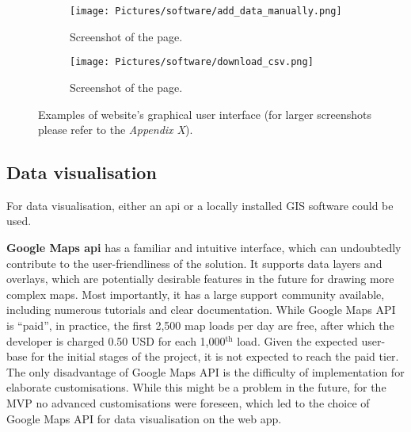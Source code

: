\begin{figure} [H]
    \begin{subfigure}{.48\textwidth}
        \centering
        \texttt{[image: Pictures/software/add\_data\_manually.png]}
        \captionsetup{justification = centering}
        \caption{Screenshot of the  page.}
        \label{fig:add_data}
    \end{subfigure}
    \begin{subfigure}{.48\textwidth}
        \centering
        \texttt{[image: Pictures/software/download\_csv.png]}
        \captionsetup{justification = centering}
        \caption{Screenshot of the  page.}
        \label{fig:dl_csv}
    \end{subfigure}
    \captionsetup{justification=centering}
    \caption{Examples of website's graphical user interface (for larger screenshots please refer to the \textit{Appendix X}).}
    \label{fig:website_software}
\end{figure}
\clearpage
\subsection{Data visualisation}
For data visualisation, either an \gls{api} or a locally installed GIS software could be used.
    

\textbf{Google Maps \gls{api}} has a familiar and intuitive interface, which can undoubtedly contribute to the user-friendliness of the solution. It supports data layers and overlays, which are potentially desirable features in the future for drawing more complex maps. Most importantly, it has a large support community available, including numerous tutorials and clear documentation. While Google Maps API is ``paid'', in practice, the first 2,500 map loads per day are free, after which the developer is charged 0.50 USD for each 1,000$^\text{th}$ load. Given the expected user-base for the initial stages of the project, it is not expected to reach the paid tier. The only disadvantage of Google Maps API is the difficulty of implementation for elaborate customisations. While this might be a problem in the future, for the MVP no advanced customisations were foreseen, which led to the choice of Google Maps API for data visualisation on the web app.


